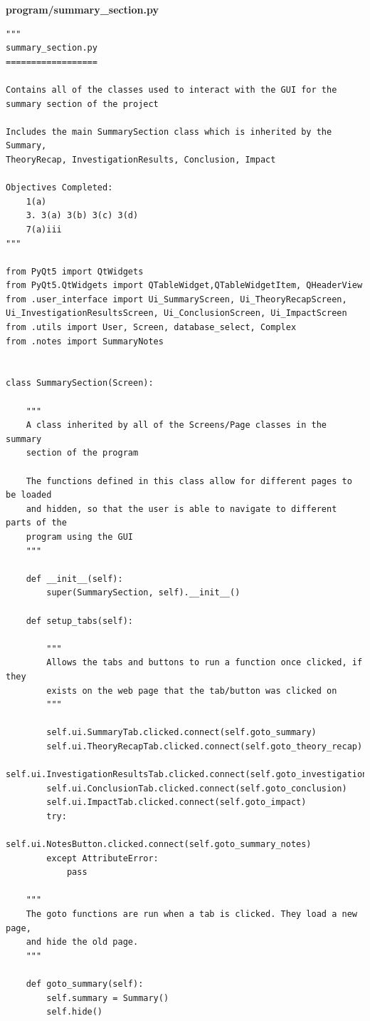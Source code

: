 \documentclass{article}
\begin{document}
\textbf{program/summary\_section.py}
\begin{lstlisting}
"""
summary_section.py
==================

Contains all of the classes used to interact with the GUI for the
summary section of the project

Includes the main SummarySection class which is inherited by the Summary,
TheoryRecap, InvestigationResults, Conclusion, Impact

Objectives Completed:
    1(a)
    3. 3(a) 3(b) 3(c) 3(d)
    7(a)iii
"""

from PyQt5 import QtWidgets
from PyQt5.QtWidgets import QTableWidget,QTableWidgetItem, QHeaderView
from .user_interface import Ui_SummaryScreen, Ui_TheoryRecapScreen, Ui_InvestigationResultsScreen, Ui_ConclusionScreen, Ui_ImpactScreen
from .utils import User, Screen, database_select, Complex
from .notes import SummaryNotes


class SummarySection(Screen):

    """
    A class inherited by all of the Screens/Page classes in the summary
    section of the program

    The functions defined in this class allow for different pages to be loaded
    and hidden, so that the user is able to navigate to different parts of the
    program using the GUI
    """

    def __init__(self):
        super(SummarySection, self).__init__()

    def setup_tabs(self):

        """
        Allows the tabs and buttons to run a function once clicked, if they
        exists on the web page that the tab/button was clicked on
        """

        self.ui.SummaryTab.clicked.connect(self.goto_summary)
        self.ui.TheoryRecapTab.clicked.connect(self.goto_theory_recap)
        self.ui.InvestigationResultsTab.clicked.connect(self.goto_investigation_results)
        self.ui.ConclusionTab.clicked.connect(self.goto_conclusion)
        self.ui.ImpactTab.clicked.connect(self.goto_impact)
        try:
            self.ui.NotesButton.clicked.connect(self.goto_summary_notes)
        except AttributeError:
            pass

    """
    The goto functions are run when a tab is clicked. They load a new page,
    and hide the old page.
    """

    def goto_summary(self):
        self.summary = Summary()
        self.hide()


\end{lstlisting}
\end{document}
